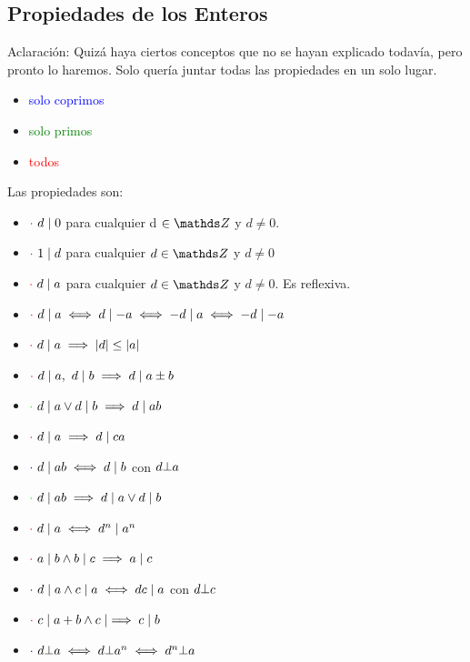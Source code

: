 \documentclass[10pt,a4paper]{article}
\newcommand{\dent}{\mathrel{\mid}}
\newcommand{\tinvertida}{\rotatebox[origin=c]{180}{$\top$}}
\begin{document}
\subsection*{Propiedades de los Enteros}
Aclaración: Quizá haya ciertos conceptos que no se hayan explicado todavía, pero pronto lo haremos. Solo quería juntar todas las propiedades en un solo lugar.
\begin{itemize}
    \item \textcolor{blue}{solo coprimos}
    \item \textcolor{green}{solo primos}
    \item \textcolor{red}{todos}
\end{itemize}
Las propiedades son: 
\begin{itemize}
    \item $\textcolor{red}{\cdot} \ d \dent 0$ para cualquier d $\in \ent$  y $ d \neq 0$.
    \item $\textcolor{red}{\cdot} \ 1 \dent d$ para cualquier $ d \in \ent $ y $ d \neq 0$
    \item $\textcolor{red}{\cdot} \ d \dent a$ para cualquier $ d \in \ent $ y $ d \neq 0$. Es reflexiva.
    \item $\textcolor{red}{\cdot} \ d \dent a \iff d \dent -a \iff -d \dent a \iff -d \dent -a $
    \item $\textcolor{red}{\cdot} \ d \dent a \implies \longitud{d} \le \longitud{a}$
    \item $\textcolor{red}{\cdot} \ d \dent a, \ d \dent b \implies d \dent a \pm b$
    \item $\textcolor{green}{\cdot} \ d \dent a \lor d \dent b \implies d \dent ab$
    \item $\textcolor{red}{\cdot} \ d \dent a \implies d \dent ca $
    \item $\textcolor{blue}{\cdot} \ d \dent ab \iff d \dent b$ con $ d \tinvertida a$
    \item $\textcolor{green}{\cdot} \ d \dent ab \implies d \dent a \lor d \dent b$ 
    \item $\textcolor{red}{\cdot} \ d \dent a \iff d^{n} \dent a^{n}$
    \item $\textcolor{red}{\cdot} \ a \dent b \land b \dent c \implies a \dent c$
    \item  $\textcolor{blue}{\cdot} \ d \dent a \land c \dent a \iff dc \dent a$ con $ d \tinvertida c$
    \item $\textcolor{red}{\cdot} \ c \dent a+b \land c \dent \implies c \dent b$
     \item  $\textcolor{blue}{\cdot} \ d \tinvertida a \iff d \tinvertida a^{n} \iff d^{n} \tinvertida a$
\end{itemize}
\end{document}
